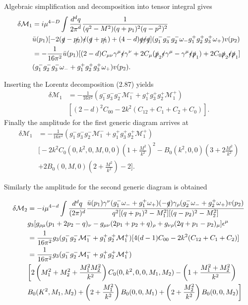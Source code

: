 Algebraic simplification and decomposition into tensor integral gives
\begin{align}
\delta\mathcal{M}_1&=i\mu^{4-D}\int\frac{d^dq}{{2\pi}^d}\frac{1}{(q^2-M^2)(q+p_1)^2(q-p^2)^2}\nonumber\\
&\bar{u}(p_1)[-2(\slashed{q}-\slashed{p_2})\slashed{\epsilon}(\slashed{q}+\slashed{p_1})+(4-d)\slashed{q}\slashed{e}\slashed{q}](
g_1^-g_3^-g_2^-\omega_-g_1^+g_2^+g_3^+\omega_+)v(p_2)\nonumber\\
&=-\frac{1}{16\pi^2}\bar{u}(p_1)[(2-d)C_{\mu\nu}\gamma^\mu\slashed{\epsilon}\gamma^\nu+2C_\mu(\slashed{p}_2\slashed{\epsilon}\gamma^\mu-\gamma^\mu\slashed{\epsilon}\slashed{p}_1)+2C_0\slashed{p}_2\slashed{\epsilon}\slashed{p}_1]\nonumber\\
&(g^-_1g^-_2g^-_3\omega_-+g^+_1g^+_2g^+_3\omega_+)v(p_2).
\end{align}

Inserting the Lorentz decomposition (2.87) yields 
\begin{align}
\delta\mathcal{M}_1&=-\frac{1}{16\pi^2}(g_1^-g_3^-
g_2^-\mathcal{M}^-_1+g_1^+g_3^+
g_2^+\mathcal{M}^+_1)\nonumber\\
&[(2-d)^2C_{00}-2k^2(C_{12}+C_1+C_2+C_0)].
\end{align}
Finally the amplitude for the first generic diagram arrives at 
\begin{align}
\delta\mathcal{M}_1&=-\frac{1}{16\pi^2}(g_1^-g_3^-
g_2^-\mathcal{M}^-_1+g_1^+g_3^+
g_2^+\mathcal{M}^+_1)\nonumber\\
&\biggl[-2k^2C_0(0,k^2,0,M,0,0)(1+\frac{M^2}{k^2})^2-B_0(k^2,0,0)(3+2\frac{M^2}{k^2})\nonumber\\
&+2B_0(0,M,0)(2+\frac{M^2}{k^2})-2\biggr].
\end{align}

Similarly the amplitude for the second generic diagram is obtained

\begin{align}
\delta\mathcal{M}_2&=-i\mu^{4-d}\int\frac{d^dq}{(2\pi)^d}\frac{\bar{u}(p_1)\gamma^\nu(g_1^-\omega_-+g_1^+\omega_+)(-\slashed{q})\gamma_\rho(g_2^-\omega_-+g_2^+\omega_+)v(p_2)}{q^2[(q+p_1)^2-M_1^2][(q-p_2)^2-M_2^2]}\nonumber\\
&g_3[g_{\rho\mu}(p_1+2p_2-q)_\nu-g_{\mu\nu}(2p_1+p_2+q)_\rho+g_{\nu\rho}(2q+p_1-p_2)_\mu]\epsilon^\mu\nonumber\\
&=\frac{1}{16\pi^2}g_3(g_1^-g_2^-\mathcal{M}_1^-+g_1^+g_2^+\mathcal{M}_1^+)[4(d-1)C_{00}-2k^2(C_{12}+C_1+C_2)]\nonumber\\
&=\frac{1}{16\pi^2}g_3(g_1^-g_2^-\mathcal{M}_1^-+g_1^+g_2^+\mathcal{M}_1^+)\nonumber\\
&\biggl[2\left(M_1^2+M_2^2+\frac{M_1^2M_2^2}{k^2}\right)C_0(0,k^2,0,0,M_1,M_2)-\left(1+\frac{M_1^2+M_2^2}{k^2}\right)\nonumber\\
&B_0(K^2,M_1,M_2)+\left( 2+\frac{M_1^2}{k^2}\right)B_0(0,0,M_1)+\left( 2+\frac{M_2^2}{k^2}\right)B_0(0,0,M_2) 
\biggr]\nonumber\\
\end{align}

